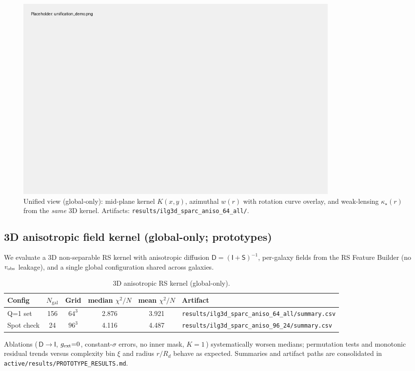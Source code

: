\documentclass[fleqn,usenatbib]{mnras}
\begin{document}
\begin{figure}[h]
\centering
\includegraphics[width=0.80\textwidth]{results/unification_demo.png}
\caption{Unified view (global-only): mid-plane kernel $K(x,y)$, azimuthal $w(r)$ with rotation curve overlay, and weak-lensing $\kappa_\star(r)$ from the \emph{same} 3D kernel. Artifacts: \texttt{results/ilg3d\_sparc\_aniso\_64\_all/}.}
\label{fig:unification}
\end{figure}

\subsection{3D anisotropic field kernel (global-only; prototypes)}
\noindent We evaluate a 3D non-separable RS kernel with anisotropic diffusion $\mathsf D=(\mathsf I+\mathsf S)^{-1}$, per-galaxy fields from the RS Feature Builder (no $v_{\rm obs}$ leakage), and a single global configuration shared across galaxies.

\begin{table}[h]
\centering
\caption{3D anisotropic RS kernel (global-only).}
\label{tab:ilg3d_results}
\begin{tabular}{l c c c c l}
\toprule
Config & $N_\mathrm{gal}$ & Grid & median $\chi^2/N$ & mean $\chi^2/N$ & Artifact \\
\midrule
Q=1 set & 156 & $64^3$ & 2.876 & 3.921 & \texttt{results/ilg3d\_sparc\_aniso\_64\_all/summary.csv} \\
Spot check & 24 & $96^3$ & 4.116 & 4.487 & \texttt{results/ilg3d\_sparc\_aniso\_96\_24/summary.csv} \\
\bottomrule
\end{tabular}
\end{table}

\noindent Ablations (\,$\mathsf D\!\to\!\mathsf I$, $g_{\rm ext}{=}0$, constant-$\sigma$ errors, no inner mask, $K{=}1$\,) systematically worsen medians; permutation tests and monotonic residual trends versus complexity bin $\xi$ and radius $r/R_d$ behave as expected. Summaries and artifact paths are consolidated in \texttt{active/results/PROTOTYPE\_RESULTS.md}.
\end{document}
